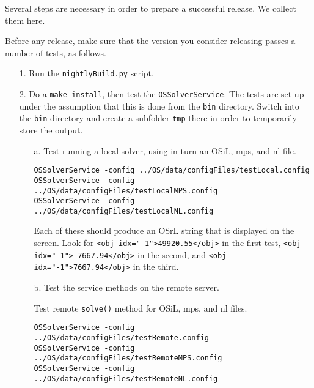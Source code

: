 \label{section:ReleaseProcedure}

Several steps are necessary in order to prepare a successful release. We collect them here.


\label{section:ReleaseTesting}

Before any release, make sure that the version you consider releasing passes a number of tests, as follows. 

\begin{itemize}

\item[1.] Run the {\tt nightlyBuild.py} script.

\item[2.] Do a {\tt make install}, then test the {\tt OSSolverService}. The tests are set up under the
assumption that this is done from the {\tt bin} directory. Switch into  the {\tt bin} directory and create a subfolder {\tt tmp} there in order to temporarily store the output.

\begin{itemize}
\item[a.] Test running a local solver,  
using in turn an OSiL, mps, and nl file.

\begin{verbatim}
OSSolverService -config ../OS/data/configFiles/testLocal.config
OSSolverService -config ../OS/data/configFiles/testLocalMPS.config
OSSolverService -config ../OS/data/configFiles/testLocalNL.config
\end{verbatim}

Each of these should produce an OSrL string that is displayed on the screen.
Look for {\tt <obj idx="-1">49920.55</obj>} in the first test, 
{\tt <obj idx="-1">-7667.94</obj>} in the second, 
and {\tt <obj idx="-1">7667.94</obj>} in the third.

\item[b.]  Test the service methods on the remote server.  

 Test remote {\tt solve()} method for OSiL, mps, and nl files.

\begin{verbatim}
OSSolverService -config ../OS/data/configFiles/testRemote.config
OSSolverService -config ../OS/data/configFiles/testRemoteMPS.config
OSSolverService -config ../OS/data/configFiles/testRemoteNL.config
\end{verbatim}



\end{itemize}
\end{itemize}
